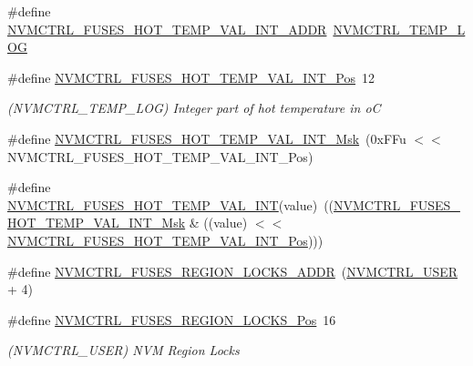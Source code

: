 \begin{DoxyCompactItemize}
\item 
\#define \mbox{\hyperlink{group__fuses__api_gad10eed1f2e268f732461b35ff0a5534d}{N\+V\+M\+C\+T\+R\+L\+\_\+\+F\+U\+S\+E\+S\+\_\+\+H\+O\+T\+\_\+\+T\+E\+M\+P\+\_\+\+V\+A\+L\+\_\+\+I\+N\+T\+\_\+\+A\+D\+DR}}~\mbox{\hyperlink{group___s_a_m_d21_j18_a__base_gae900d443ec6d7cf1c90d21b6662fa447}{N\+V\+M\+C\+T\+R\+L\+\_\+\+T\+E\+M\+P\+\_\+\+L\+OG}}
\item 
\#define \mbox{\hyperlink{group__fuses__api_ga77ded05d5530304d7f7c5e00616e24a2}{N\+V\+M\+C\+T\+R\+L\+\_\+\+F\+U\+S\+E\+S\+\_\+\+H\+O\+T\+\_\+\+T\+E\+M\+P\+\_\+\+V\+A\+L\+\_\+\+I\+N\+T\+\_\+\+Pos}}~12
\begin{DoxyCompactList}\small\item\em (N\+V\+M\+C\+T\+R\+L\+\_\+\+T\+E\+M\+P\+\_\+\+L\+OG) Integer part of hot temperature in oC \end{DoxyCompactList}\item 
\#define \mbox{\hyperlink{group__fuses__api_gacf566db13458407fa624d255585d43c3}{N\+V\+M\+C\+T\+R\+L\+\_\+\+F\+U\+S\+E\+S\+\_\+\+H\+O\+T\+\_\+\+T\+E\+M\+P\+\_\+\+V\+A\+L\+\_\+\+I\+N\+T\+\_\+\+Msk}}~(0x\+F\+Fu $<$$<$ N\+V\+M\+C\+T\+R\+L\+\_\+\+F\+U\+S\+E\+S\+\_\+\+H\+O\+T\+\_\+\+T\+E\+M\+P\+\_\+\+V\+A\+L\+\_\+\+I\+N\+T\+\_\+\+Pos)
\item 
\#define \mbox{\hyperlink{group__fuses__api_gaa03571b8d91357795b213f28a90a69e3}{N\+V\+M\+C\+T\+R\+L\+\_\+\+F\+U\+S\+E\+S\+\_\+\+H\+O\+T\+\_\+\+T\+E\+M\+P\+\_\+\+V\+A\+L\+\_\+\+I\+NT}}(value)~((\mbox{\hyperlink{group__fuses__api_gacf566db13458407fa624d255585d43c3}{N\+V\+M\+C\+T\+R\+L\+\_\+\+F\+U\+S\+E\+S\+\_\+\+H\+O\+T\+\_\+\+T\+E\+M\+P\+\_\+\+V\+A\+L\+\_\+\+I\+N\+T\+\_\+\+Msk}} \& ((value) $<$$<$ \mbox{\hyperlink{group__fuses__api_ga77ded05d5530304d7f7c5e00616e24a2}{N\+V\+M\+C\+T\+R\+L\+\_\+\+F\+U\+S\+E\+S\+\_\+\+H\+O\+T\+\_\+\+T\+E\+M\+P\+\_\+\+V\+A\+L\+\_\+\+I\+N\+T\+\_\+\+Pos}})))
\item 
\#define \mbox{\hyperlink{group__fuses__api_gaa6991e05f9343dab06efb7e275ab84fd}{N\+V\+M\+C\+T\+R\+L\+\_\+\+F\+U\+S\+E\+S\+\_\+\+R\+E\+G\+I\+O\+N\+\_\+\+L\+O\+C\+K\+S\+\_\+\+A\+D\+DR}}~(\mbox{\hyperlink{group___s_a_m_d21_j18_a__base_ga7a7a83a5753fa323b61536e396083c99}{N\+V\+M\+C\+T\+R\+L\+\_\+\+U\+S\+ER}} + 4)
\item 
\#define \mbox{\hyperlink{group__fuses__api_ga553b4d761e65080381c6af440abee0f0}{N\+V\+M\+C\+T\+R\+L\+\_\+\+F\+U\+S\+E\+S\+\_\+\+R\+E\+G\+I\+O\+N\+\_\+\+L\+O\+C\+K\+S\+\_\+\+Pos}}~16
\begin{DoxyCompactList}\small\item\em (N\+V\+M\+C\+T\+R\+L\+\_\+\+U\+S\+ER) N\+VM Region Locks \end{DoxyCompactList}\item 

\end{DoxyCompactItemize}
